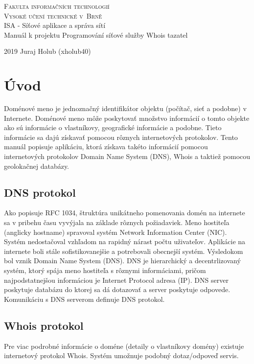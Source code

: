 \documentclass[a4paper, 11pt]{article}
\begin{document}
\begin{titlepage}
	\begin{center}
		\Huge
		\textsc{Fakulta informačních technologií \\
			Vysoké učení technické v~Brně} \\
		{\LARGE
			ISA - Síťové aplikace a správa sítí \\ 
			\medskip \Large{Manuál k projektu 
				Programování síťové služby Whois tazatel}
			}
	\end{center}
		\setlength{\parindent}{0.3em}
		{\Large 2019 \hfill
			Juraj Holub (xholub40)}
\end{titlepage}

\tableofcontents
\newpage

\section{Úvod}
Doménové meno je jednoznačný identifikátor objektu (počítač, sieť a podobne) v Internete. Doménové meno môže poskytovať množstvo informácií o tomto objekte ako sú informácie o vlastníkovy, geografické informácie a podobne. Tieto informácie sa dajú získavať pomocou rôznych internetových protokolov. Tento manuál popisuje aplikáciu, ktorá získava takéto informácií pomocou internetových protokolov Domain Name System (DNS), Whois a taktiež pomocou geolokačnej databázy.

\subsection{DNS protokol}
Ako popisuje RFC 1034\cite{RFC1034}, štruktúra unikátneho pomenovania domén na internete sa v pribehu času vyvýjala na základe rôznych požiadaviek. Meno hostiteľa (anglicky hostname) spravoval systém Network Information Center (NIC). Systém nedostačoval vzhľadom na rapidný nárast počtu uživateľov. Aplikácie na internete boli stále sofistikovanejšie a potrebovali obecnejší systém. Výsledokom bol vznik Domain Name System (DNS). DNS je hierarchický a decentrlizovaný systém, ktorý spája meno hostiteľa s rôznymi informáciami, pričom najpodstatnejšou informáciou je Internet Protocol adresa (IP). DNS server poskytuje databázu do ktorej sa dá dotazovať a server poskytuje odpovede. Komunikáciu s DNS serverom definuje DNS protokol. 

\subsection{Whois protokol}
Pre viac podrobné informácie o doméne (detaily o vlastníkovy domény) existuje internetový protokol Whois\cite{RFC3912}. Systém umožnuje podobný dotaz/odpoveď servis.
\end{document}
